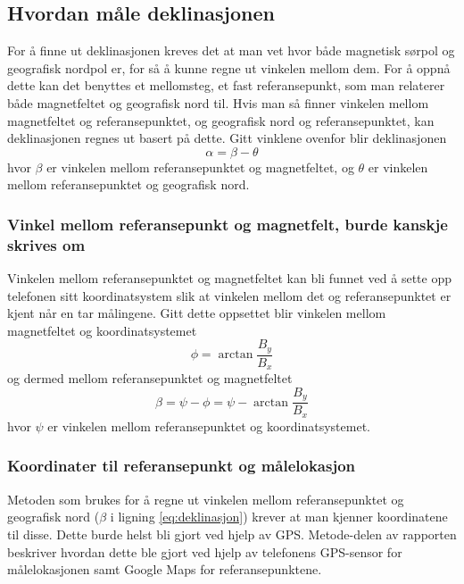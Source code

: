 \subsection{Hvordan måle deklinasjonen}
For å finne ut deklinasjonen kreves det at man vet hvor både magnetisk sørpol og 
geografisk nordpol er, for så å kunne regne ut vinkelen mellom dem. For å oppnå dette 
kan det benyttes et mellomsteg, et fast referansepunkt, som man relaterer både 
magnetfeltet og geografisk nord til. Hvis man så finner vinkelen mellom magnetfeltet 
og referansepunktet, og geografisk nord og referansepunktet, kan deklinasjonen 
regnes ut basert på dette. Gitt vinklene ovenfor blir deklinasjonen
\begin{equation}
    \label{eq:deklinasjon}
    \alpha = \beta - \theta
\end{equation}
hvor $\beta$ er vinkelen mellom referansepunktet og magnetfeltet, og $\theta$ er 
vinkelen mellom referansepunktet og geografisk nord.

\subsubsection{Vinkel mellom referansepunkt og magnetfelt, burde kanskje skrives om}
Vinkelen mellom referansepunktet og magnetfeltet kan bli funnet ved å sette opp 
telefonen sitt koordinatsystem slik at vinkelen mellom det og referansepunktet er 
kjent når en tar målingene. Gitt dette oppsettet blir vinkelen mellom magnetfeltet 
og koordinatsystemet
\begin{equation}
    \phi = \arctan \frac{B_y}{B_x}
\end{equation}
og dermed mellom referansepunktet og magnetfeltet
\begin{equation}
    \beta = \psi - \phi = \psi - \arctan \frac{B_y}{B_x}
\end{equation}
hvor $\psi$ er vinkelen mellom referansepunktet og koordinatsystemet.

\subsubsection{Koordinater til referansepunkt og målelokasjon}
Metoden som brukes for å regne ut vinkelen mellom referansepunktet og geografisk nord ($\beta$ i ligning \eqref{eq:deklinasjon}) krever at man kjenner koordinatene til disse. Dette burde helst bli gjort ved hjelp av GPS. Metode-delen av rapporten beskriver hvordan dette ble gjort ved hjelp av telefonens GPS-sensor for målelokasjonen samt Google Maps for referansepunktene.

